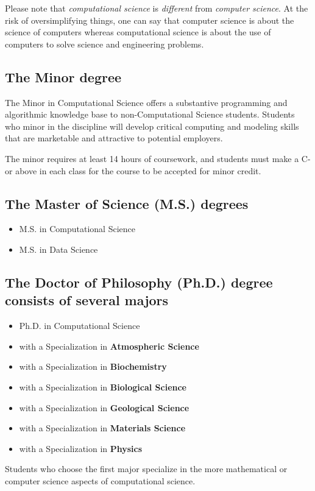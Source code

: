 \documentclass[12pt,a4paper]{article}
\begin{document}
Please note that \textit{computational science} is \textit{different} from \textit{computer science}. At the risk of oversimplifying things, one can say that computer science is about the science of computers whereas computational science is about the use of computers to solve science and engineering problems.

\subsection*{The Minor degree}
The Minor in Computational Science offers a substantive programming and algorithmic knowledge base to non-Computational Science students. Students who minor in the discipline will develop critical computing and modeling skills that are marketable and attractive to potential employers.

The minor requires at least 14 hours of coursework, and students must make a C- or above in each class for the course to be accepted for minor credit.

\subsection*{The Master of Science (M.S.) degrees}
\begin{itemize}
    \item M.S. in Computational Science
    \item M.S. in Data Science
\end{itemize}

\subsection*{The Doctor of Philosophy (Ph.D.) degree consists of several majors}
\begin{itemize}
    \item Ph.D. in Computational Science
    \item with a Specialization in \textbf{Atmospheric Science}
    \item with a Specialization in \textbf{Biochemistry}
    \item with a Specialization in \textbf{Biological Science}
    \item with a Specialization in \textbf{Geological Science}
    \item with a Specialization in \textbf{Materials Science}
    \item with a Specialization in \textbf{Physics}
\end{itemize}
Students who choose the first major specialize in the more mathematical or computer science aspects of computational science.
\end{document}
